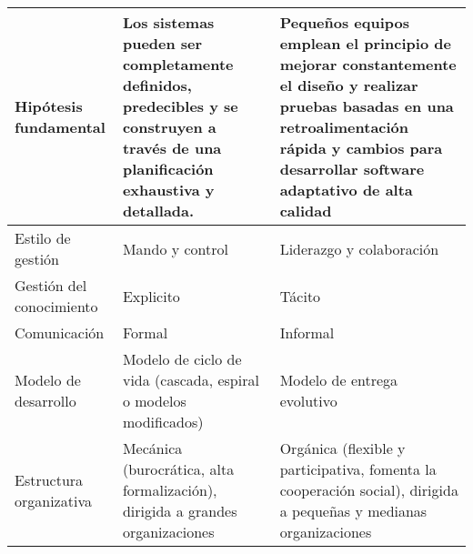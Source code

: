 \begin{longtable}{|p{3cm}|p{5cm}|p{5cm}|}
    \hline \hline
    \endlastfoot
    Hipótesis fundamental                          & Los sistemas pueden ser completamente definidos, predecibles y se construyen a través de una planificación exhaustiva y detallada. & Pequeños equipos emplean el principio de mejorar constantemente el diseño y realizar pruebas basadas en una retroalimentación rápida y cambios para desarrollar software adaptativo de alta calidad \\\hline
    Estilo de gestión                              & Mando y control                                                                                                                    & Liderazgo y colaboración                                                                                                                                                                            \\\hline
    Gestión del conocimiento                       & Explicito                                                                                                                          & Tácito                                                                                                                                                                                              \\\hline
    Comunicación                                   & Formal                                                                                                                             & Informal                                                                                                                                                                                            \\\hline
    Modelo de desarrollo                           & Modelo de ciclo de vida (cascada, espiral o modelos modificados)                                                                   & Modelo de entrega evolutivo                                                                                                                                                                         \\\hline
    Estructura organizativa                        & Mecánica (burocrática, alta formalización), dirigida a grandes organizaciones                                                      & Orgánica (flexible y participativa, fomenta la cooperación social), dirigida a pequeñas y medianas organizaciones                                                                                   \\\hline

\end{longtable}
